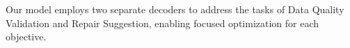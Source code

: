{%





Our model employs two separate decoders to address the tasks of Data Quality Validation and Repair Suggestion, enabling focused optimization for each objective.

}

